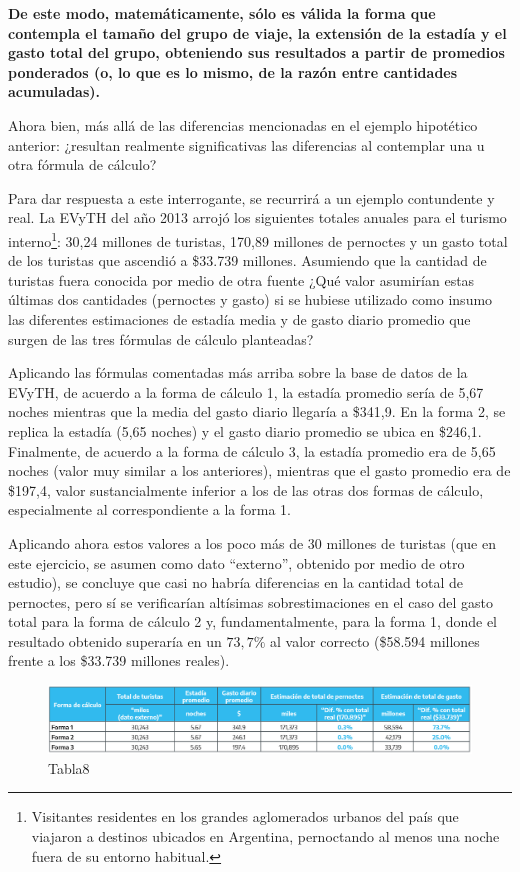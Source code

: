 \documentclass[
]{book}
\begin{document}
\textbf{De este modo, matemáticamente, sólo es válida la forma que contempla el tamaño del grupo de viaje, la extensión de la estadía y el gasto total del grupo, obteniendo sus resultados a partir de promedios ponderados (o, lo que es lo mismo, de la razón entre cantidades acumuladas).}

Ahora bien, más allá de las diferencias mencionadas en el ejemplo hipotético anterior: ¿resultan realmente significativas las diferencias al contemplar una u otra fórmula de cálculo?

Para dar respuesta a este interrogante, se recurrirá a un ejemplo contundente y real. La EVyTH del año 2013 arrojó los siguientes totales anuales para el turismo interno\footnote{Visitantes residentes en los grandes aglomerados urbanos del país que viajaron a destinos ubicados en Argentina, pernoctando al menos una noche fuera de su entorno habitual.}: 30,24 millones de turistas, 170,89 millones de pernoctes y un gasto total de los turistas que ascendió a \$33.739 millones. Asumiendo que la cantidad de turistas fuera conocida por medio de otra fuente ¿Qué valor asumirían estas últimas dos cantidades (pernoctes y gasto) si se hubiese utilizado como insumo las diferentes estimaciones de estadía media y de gasto diario promedio que surgen de las tres fórmulas de cálculo planteadas?

Aplicando las fórmulas comentadas más arriba sobre la base de datos de la EVyTH, de acuerdo a la forma de cálculo 1, la estadía promedio sería de 5,67 noches mientras que la media del gasto diario llegaría a \$341,9. En la forma 2, se replica la estadía (5,65 noches) y el gasto diario promedio se ubica en \$246,1. Finalmente, de acuerdo a la forma de cálculo 3, la estadía promedio era de 5,65 noches (valor muy similar a los anteriores), mientras que el gasto promedio era de \$197,4, valor sustancialmente inferior a los de las otras dos formas de cálculo, especialmente al correspondiente a la forma 1.

Aplicando ahora estos valores a los poco más de 30 millones de turistas (que en este ejercicio, se asumen como dato ``externo'', obtenido por medio de otro estudio), se concluye que casi no habría diferencias en la cantidad total de pernoctes, pero sí se verificarían altísimas sobrestimaciones en el caso del gasto total para la forma de cálculo 2 y, fundamentalmente, para la forma 1, donde el resultado obtenido superaría en un \(73,7\%\) al valor correcto (\$58.594 millones frente a los \$33.739 millones reales).

\begin{figure}
\includegraphics[width=1\linewidth]{imagenes/tabla_8} \caption{Tabla8}\label{fig:Formadecalculo}
\end{figure}
\end{document}
